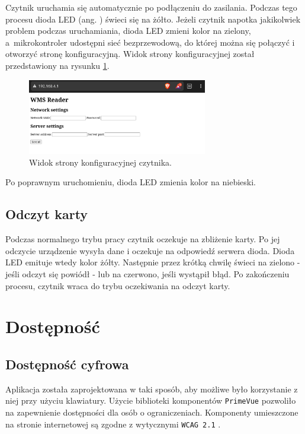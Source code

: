 Czytnik uruchamia się automatycznie po podłączeniu do zasilania. Podczas tego procesu dioda LED (ang. ) świeci się na żółto. Jeżeli czytnik napotka jakikolwiek problem podczas uruchamiania, dioda LED zmieni kolor na zielony, a~mikrokontroler udostępni sieć bezprzewodową, do której można się połączyć i otworzyć stronę konfiguracyjną. Widok strony konfiguracyjnej został przedstawiony na rysunku \ref{fig:readerConfig}.

\begin{figure}[H]
    \centering
    \includegraphics[width=0.7\textwidth, frame]{graf/readerSetup.jpg}
    \caption{Widok strony konfiguracyjnej czytnika.}
    \label{fig:readerConfig}
\end{figure}

Po poprawnym uruchomieniu, dioda LED zmienia kolor na niebieski.

\subsection{Odczyt karty}

Podczas normalnego trybu pracy czytnik oczekuje na zbliżenie karty. Po jej odczycie urządzenie wysyła dane i oczekuje na odpowiedź serwera dioda. Dioda LED emituje wtedy kolor żółty. Następnie przez krótką chwilę świeci na zielono - jeśli odczyt się powiódł - lub na czerwono, jeśli wystąpił błąd. Po zakończeniu procesu, czytnik wraca do trybu oczekiwania na odczyt karty.

\section{Dostępność}

\subsection{Dostępność cyfrowa}

Aplikacja została zaprojektowana w taki sposób, aby możliwe było korzystanie z niej przy użyciu klawiatury. Użycie biblioteki komponentów \texttt{PrimeVue} pozwoliło na zapewnienie dostępności dla osób o ograniczeniach. Komponenty umieszczone na stronie internetowej są zgodne z wytycznymi \texttt{WCAG 2.1} \cite{bib:WCAG21}.

